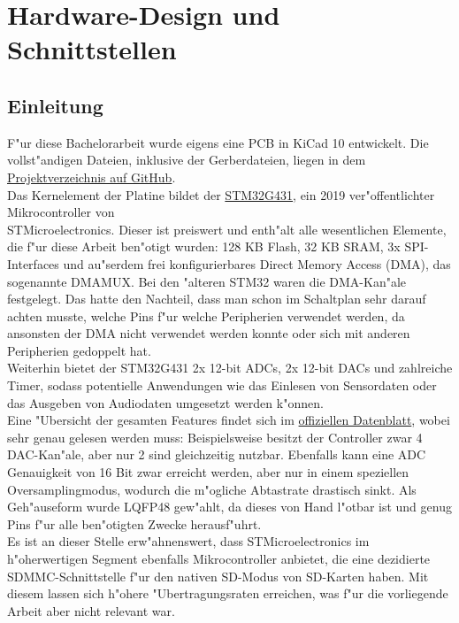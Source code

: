 \documentclass[11pt]{article}
\begin{document}
\section{Hardware-Design und Schnittstellen}

\subsection{Einleitung}
F"ur diese Bachelorarbeit wurde eigens eine PCB in KiCad 10 entwickelt.
Die vollst"andigen Dateien, inklusive der Gerberdateien, liegen in
dem \href{https://github.com/miko8278/stm32-SPI-SD-card/tree/main/PCB}{Projektverzeichnis auf GitHub}.\\

Das Kernelement der Platine bildet der \href{https://www.st.com/en/microcontrollers-microprocessors/stm32g431rb.html}{STM32G431}, 
ein 2019 ver"offentlichter Mikrocontroller von \\
STMicroelectronics\cite{st1}.
Dieser ist preiswert und enth"alt alle wesentlichen Elemente, die f"ur diese Arbeit ben"otigt wurden:
128 KB Flash, 32 KB SRAM, 3x SPI-Interfaces und au"serdem frei konfigurierbares Direct Memory Access (DMA),
das sogenannte DMAMUX.
Bei den "alteren STM32 waren die DMA-Kan"ale festgelegt. Das hatte den Nachteil, dass man schon 
im Schaltplan sehr darauf achten musste, welche Pins f"ur welche Peripherien verwendet werden,
da ansonsten der DMA nicht verwendet werden konnte oder sich mit anderen Peripherien gedoppelt hat. \\
Weiterhin bietet der STM32G431 2x 12-bit ADCs, 2x 12-bit DACs und zahlreiche Timer, sodass potentielle Anwendungen
wie das Einlesen von Sensordaten oder das Ausgeben von Audiodaten umgesetzt werden k"onnen.\\
Eine "Ubersicht der gesamten Features findet sich im \href{https://www.st.com/resource/en/datasheet/stm32g431rb.pdf}{offiziellen Datenblatt},
wobei sehr genau gelesen werden muss: Beispielsweise besitzt der Controller zwar 4 DAC-Kan"ale, aber nur 2 sind gleichzeitig nutzbar.
Ebenfalls kann eine ADC Genauigkeit von 16 Bit zwar erreicht werden, aber nur in einem speziellen Oversamplingmodus,
wodurch die m"ogliche Abtastrate drastisch sinkt.
Als Geh"auseform wurde LQFP48 gew"ahlt, da dieses von Hand l"otbar ist und genug Pins f"ur alle ben"otigten Zwecke
herausf"uhrt. \\
Es ist an dieser Stelle erw"ahnenswert, dass STMicroelectronics im h"oherwertigen Segment ebenfalls 
Mikrocontroller anbietet, die eine dezidierte SDMMC-Schnittstelle f"ur den nativen SD-Modus von SD-Karten haben.
Mit diesem lassen sich h"ohere "Ubertragungsraten erreichen, was f"ur die vorliegende Arbeit aber nicht relevant war.\\
\end{document}
